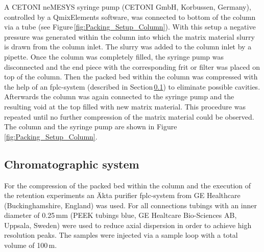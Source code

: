 A CETONI neMESYS syringe pump (CETONI GmbH, Korbussen, Germany), controlled by a QmixElements software, was connected to bottom of the column via a tube (see Figure\,\ref{fig:Packing_Setup_Column}). With this setup a negative pressure was generated within the column into which the matrix material slurry is drawn from the column inlet. The slurry was added to the column inlet by a pipette. Once the column was completely filled, the syringe pump was disconnected and the end piece with the corresponding frit or filter was placed on top of the column. Then the packed bed within the column was compressed with the help of an \gls{fplc}-system (described in Section\,\ref{subsec:chrom_sys}) to eliminate possible cavities. Afterwards the column was again connected to the syringe pump and the resulting void at the top filled with new matrix material. This procedure was repeated until no further compression of the matrix material could be observed. The column and the syringe pump are shown in Figure\,\ref{fig:Packing_Setup_Column}.


% 
% 
%         

\FloatBarrier
\subsection{Chromatographic system}
\label{subsec:chrom_sys}
For the compression of the packed bed within the column and the execution of the retention experiments an Äkta purifier \gls{fplc}-system from GE Healthcare (Buckinghamshire, England) was used. For all connections tubings with an inner diameter of 0.25\,mm (PEEK tubings blue, GE Healtcare Bio-Sciences AB, Uppsala, Sweden) were used to reduce axial dispersion in order to achieve high resolution peaks. The samples were injected via a sample loop with a total volume of 100\,\textmu m.

